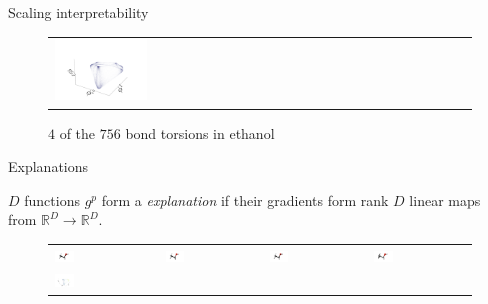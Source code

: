 \begin{frame}{Scaling interpretability}
\begin{figure}[!htp]
\begin{tabular}{p{2.5cm}p{2.5cm}p{2.5cm}p{2.5cm}}
          \includegraphics[width=0.25\textwidth, trim={1cm 0cm 4cm 4cm}, clip]{img/ethanol_embedding_3.png} 
    \end{tabular}
    \caption*{$4$ of the $756$ bond torsions in ethanol}
\end{figure}



\end{frame}

\begin{frame}{Explanations}
\begin{definition}[Explanation]
    $D$ functions $g^p$ form a {\it explanation} if their gradients form rank $D$ linear maps from $\mathbb R^D \to \mathbb R^D$.
\end{definition}
\begin{figure}[!htp]
\tiny
    \centering
    \begin{tabular}{p{2cm}p{2cm}p{2cm}p{2cm}}
        \includegraphics[width=0.2\textwidth, trim={2cm 3cm 5cm 0cm}, clip]{img/ethanol_g0.png} &
        \includegraphics[width=0.2\textwidth, trim={2cm 3cm 5cm 0cm}, clip]{img/ethanol_g1.png} &
          \includegraphics[width=0.2\textwidth, trim={2cm 3cm 5cm 0cm}, clip]{img/ethanol_g2.png} &
          \includegraphics[width=0.2\textwidth, trim={2cm 3cm 5cm 0cm}, clip]{img/ethanol_g3.png}  \\
        \includegraphics[width=0.2\textwidth, trim={1cm 0cm 4cm 4cm}, clip]{img/ethanol_embedding_0.png} &

\end{tabular}
\end{figure}
\end{frame}
